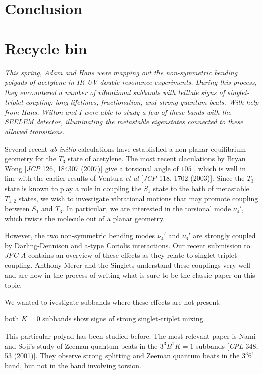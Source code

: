 \documentclass[12pt]{mitthesis}
\begin{document}
\section{Conclusion}

\section{Recycle bin}

\emph{This spring, Adam and Hans were mapping out the non-symmetric
  bending polyads of acetylene in IR-UV double resonance experiments.
  During this process, they encountered a number of vibrational
  subbands with telltale signs of singlet-triplet coupling: long
  lifetimes, fractionation, and strong quantum beats.  With help from
  Hans, Wilton and I were able to study a few of these bands with the
  SEELEM detector, illuminating the metastable eigenstates connected
  to these allowed transitions.}


Several recent \emph{ab initio} calculations have established a
non-planar equilibrium geometry for the $T_3$ state of acetylene.  The
most recent claculations by Bryan Wong [\emph{JCP} 126, 184307 (2007)]
give a torsional angle of $105^\circ$, which is well in line with the
earlier results of Ventura \emph{et al} [\emph{JCP} 118, 1702 (2003)].
Since the $T_3$ state is known to play a role in coupling the $S_1$
state to the bath of metastable $T_{1,2}$ states, we wish to
investigate vibrational motions that may promote coupling between
$S_1$ and $T_3$.  In particular, we are interested in the torsional
mode $\nu_4'$, which twists the molecule out of a planar geometry.

However, the two non-symmetric bending modes $\nu_4'$ and $\nu_6'$ are
strongly coupled by Darling-Dennison and a-type Coriolis interactions.
Our recent submission to \emph{JPC A} contains an overview of these
effects as they relate to singlet-triplet coupling.  Anthony Merer and
the Singlets understand these couplings very well and are now in the
process of writing what is sure to be the classic paper on this topic.

We wanted to ivestigate subbands where these effects are not present.

both $K=0$ subbands show signs of strong singlet-triplet mixing.

This particular polyad has been studied before. The most relevant
paper is Nami and Soji's study of Zeeman quantum beats in the $3^3 B^1
K=1$ subbands [\emph{CPL} 348, 53 (2001)].  They observe strong
splitting and Zeeman quantum beats in the $3^3 6^1$ band, but not in
the band involving torsion.
\end{document}
